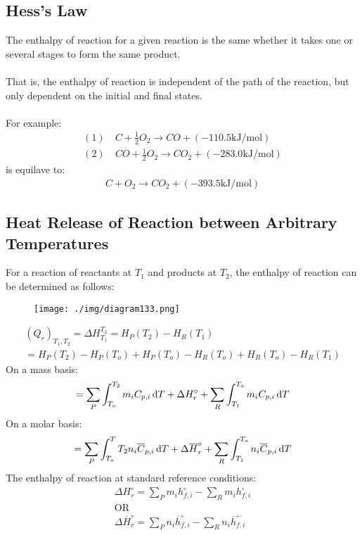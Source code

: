\subsection{Hess’s Law}
The enthalpy of reaction for a given reaction is the same whether it takes one or several stages to form the same product. \\\\
That is, the enthalpy of reaction is independent of the path of the reaction, but only dependent on the initial and final states. \\\\
For example:
\begin{align}
  (1) & \ C+\frac{1}{2}O_2 \longrightarrow CO + (-110.5 \si{\kilo\joule\per\mole})      \\[5pt]
  (2) & \ CO + \frac{1}{2}O_2 \longrightarrow CO_2 + (-283.0 \si{\kilo\joule\per\mole})
\end{align}
is equilave to:
\begin{gather}
  C + O_2 \longrightarrow CO_2 + (-393.5 \si{\kilo\joule\per\mole})
\end{gather}
\subsection{Heat Release of Reaction between Arbitrary Temperatures}
For a reaction of reactants at $T_1$ and products at $T_2$, the enthalpy of reaction can be determined as follows:
\begin{figure}[H]
  \centering
  \texttt{[image: ./img/diagram133.png]}
  \caption{}
\end{figure}
\begin{gather}
  (Q_r)_{T_1,T_2} = \Delta H_{T_1}^{T_2} = H_P(T_2) - H_R(T_1) \\[5pt]
  = H_P(T_2) - H_P(T_o) + H_P(T_o) - H_R(T_o) + H_R(T_o) - H_R(T_1)
\end{gather}
On a mass basis:
\begin{gather}
  = \sum_{P}\int_{T_o}^{T_2}m_i C_{p,i}\dif T + \Delta H_r^\circ + \sum_{R}\int_{T_1}^{T_o}m_i C_{p,i} \dif T
\end{gather}
On a molar basis:
\begin{gather}
  = \sum_{P}\int_{T_o}^T{T_2}n_i \overline{C}_{p,i} \dif T + \Delta\overline{H}_r^\circ + \sum_{R}\int_{T_1}^{T_o}n_i \overline{C}_{p,i} \dif T
\end{gather}
The enthalpy of reaction at standard reference conditions:
\begin{gather}
  \Delta H_r^\circ = \sum_{P}m_i h_{f,i}^\circ - \sum_{R}m_i h_{f,i}^\circ \\[5pt]
  \text{OR} \\[5pt]
  \Delta\overline{H}_r^\circ = \sum_{P}n_i\overline{h}_{f,i}^\circ - \sum_{R}n_i\overline{h}_{f,i}^\circ
\end{gather}
